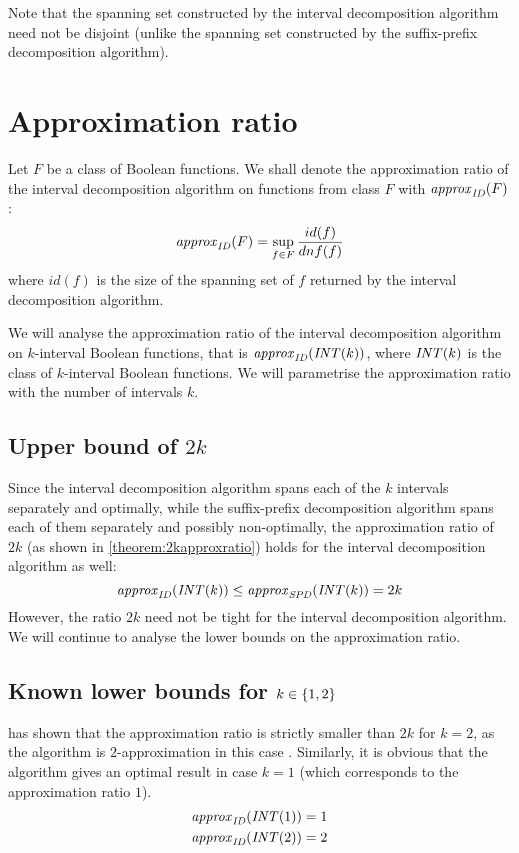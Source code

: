 Note that the spanning set constructed
by the interval decomposition algorithm
need not be disjoint
(unlike the spanning set constructed
by the suffix-prefix decomposition algorithm).

\section{Approximation ratio}

Let $F$ be a class of Boolean functions.
We shall denote the approximation ratio
of the interval decomposition algorithm
on functions from class $F$ with $\mathit{approx}_{\mathit{ID}} (F)$:
$$
\mathit{approx}_{\mathit{ID}} (F)
= \sup_{f \in F}{\frac{id(f)}{dnf(f)}}
$$
where $id(f)$ is the size of the spanning set of $f$
returned by the interval decomposition algorithm.

We will analyse the approximation ratio
of the interval decomposition algorithm
on $k$-interval Boolean functions,
that is $\mathit{approx}_{\mathit{ID}} (\mathit{INT} (k))$,
where $\mathit{INT} (k)$ is the class
of $k$-interval Boolean functions.
We will parametrise the approximation ratio
with the number of intervals $k$.

\subsection{Upper bound of $2k$}

Since the interval decomposition algorithm
spans each of the $k$ intervals separately and optimally,
while the suffix-prefix decomposition algorithm
spans each of them separately and possibly non-optimally,
the approximation ratio of $2k$
(as shown in \autoref{theorem:2kapproxratio})
holds for the interval decomposition algorithm as well:
$$
\mathit{approx}_{\mathit{ID}} (\mathit{INT} (k)) \leq \mathit{approx}_{\mathit{SPD}} (\mathit{INT} (k)) = 2k
$$
However,
the ratio $2k$ need not be tight
for the interval decomposition algorithm.
We will continue to analyse the lower bounds
on the approximation ratio.

\subsection{Known lower bounds for $k \in \{1, 2\}$}

\citeauthor{Dubovsky2012} has shown
that the approximation ratio is strictly smaller than $2k$
for $k = 2$,
as the algorithm is $2$-approximation
in this case \citep[p.~39]{Dubovsky2012}. %
Similarly,
it is obvious that the algorithm
gives an optimal result in case $k = 1$
(which corresponds to the approximation ratio $1$).
\begin{align*}
\mathit{approx}_{\mathit{ID}} (\mathit{INT} (1)) &= 1 \\
\mathit{approx}_{\mathit{ID}} (\mathit{INT} (2)) &= 2
\end{align*}

